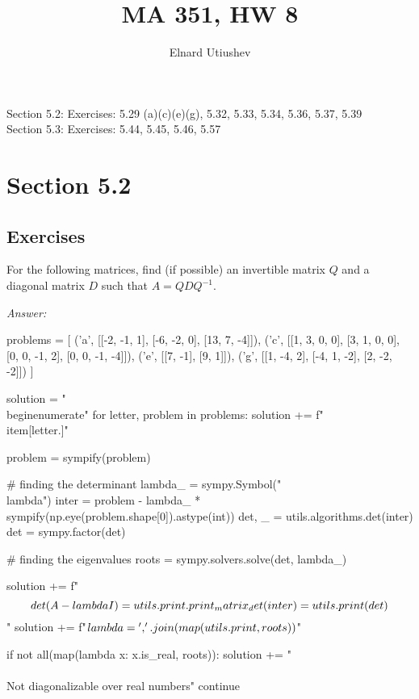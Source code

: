 \documentclass[letterpaper]{article}
\title{MA 351, HW 8}
\author{Elnard Utiushev}
\newcommand{\ans}{\textit{Answer: }}
\newenvironment{question}[2][Question]{\begin{trivlist}
\item[\hskip \labelsep {\bfseries #1}\hskip \labelsep {\bfseries #2.}]}{\end{trivlist}}
\begin{document}
\maketitle

Section 5.2: Exercises: 5.29 (a)(c)(e)(g), 5.32, 5.33, 5.34, 5.36, 5.37, 5.39 \\
Section 5.3: Exercises: 5.44, 5.45, 5.46, 5.57

\section{Section 5.2}
\subsection{Exercises}

\begin{question}{5.29 (a)(c)(e)(g)}
  For the following matrices, find (if possible) an invertible matrix $Q$ and a
  diagonal matrix $D$ such that $A=Q D Q^{-1} .$

  \ans 
  \begin{pycode}
problems = [
  ('a', [[-2, -1, 1], [-6, -2, 0], [13, 7, -4]]),
  ('c', [[1, 3, 0, 0], [3, 1, 0, 0], [0, 0, -1, 2], [0, 0, -1, -4]]),
  ('e', [[7, -1], [9, 1]]),
  ('g', [[1, -4, 2], [-4, 1, -2], [2, -2, -2]])
]

solution = "\\begin{enumerate}\n"
for letter, problem in problems:
  solution += f"\\item[{letter}.]\n"

  problem = sympify(problem)

  # finding the determinant 
  lambda_ = sympy.Symbol("\\lambda")
  inter = problem - lambda_ * sympify(np.eye(problem.shape[0]).astype(int))
  det, _ = utils.algorithms.det(inter)
  det = sympy.factor(det)

  # finding the eigenvalues
  roots = sympy.solvers.solve(det, lambda_)

  solution += f"$$\\det(A - \\lambda I) = {utils.print.print_matrix_det(inter)} = {utils.print(det)}$$\n"
  solution += f"$\\lambda = {', '.join(map(utils.print, roots))}$\n"

  if not all(map(lambda x: x.is_real, roots)):
    solution += "\\\\Not diagonalizable over real numbers\n"
    continue


\end{pycode}
\end{question}
\end{document}
